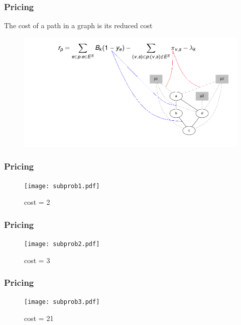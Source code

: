 \documentclass[english]{beamer}
\begin{document}
\begin{frame}
\frametitle{Pricing}
  The cost of a path in a graph is its reduced cost

  \begin{figure}
    \centering
    \includegraphics[scale=0.4]{redcost2.png}
  \end{figure}

\end{frame}
\begin{frame}
\frametitle{Pricing}
  \begin{figure}
    \centering
    \texttt{[image: subprob1.pdf]}
    \caption{cost = 2}
  \end{figure}
\end{frame}
\begin{frame}
\frametitle{Pricing}
  \begin{figure}
    \centering
    \texttt{[image: subprob2.pdf]}
    \caption{cost = 3}
  \end{figure}
\end{frame}
\begin{frame}
\frametitle{Pricing}
  \begin{figure}
    \centering
    \texttt{[image: subprob3.pdf]}
    \caption{cost = 21}
  \end{figure}
\end{frame}
\end{document}
